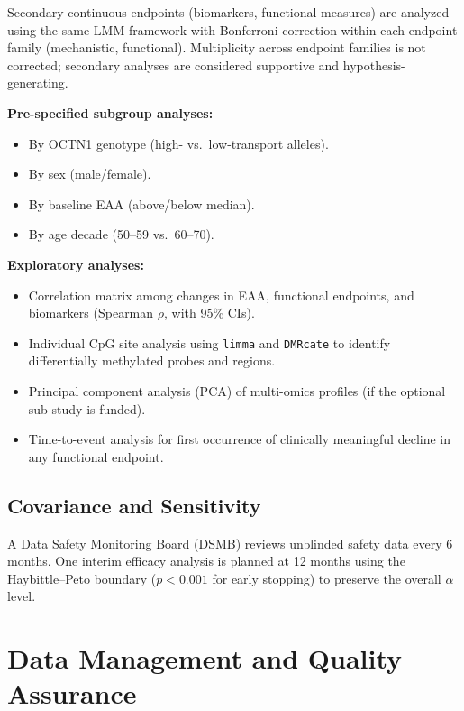 \documentclass[11pt,a4paper]{article}
\begin{document}
Secondary continuous endpoints (biomarkers, functional measures) are analyzed using the same LMM framework with Bonferroni correction within each endpoint family (mechanistic, functional). Multiplicity across endpoint families is not corrected; secondary analyses are considered supportive and hypothesis-generating.

\textbf{Pre-specified subgroup analyses:}
\begin{itemize}[nosep]
  \item By OCTN1 genotype (high- vs.~low-transport alleles).
  \item By sex (male/female).
  \item By baseline EAA (above/below median).
  \item By age decade (50--59 vs.~60--70).
\end{itemize}

\textbf{Exploratory analyses:}
\begin{itemize}[nosep]
  \item Correlation matrix among changes in EAA, functional endpoints, and biomarkers (Spearman $\rho$, with 95\% CIs).
  \item Individual CpG site analysis using \texttt{limma} and \texttt{DMRcate} to identify differentially methylated probes and regions.
  \item Principal component analysis (PCA) of multi-omics profiles (if the optional sub-study is funded).
  \item Time-to-event analysis for first occurrence of clinically meaningful decline in any functional endpoint.
\end{itemize}

\subsection{Covariance and Sensitivity}

A Data Safety Monitoring Board (DSMB) reviews unblinded safety data every 6 months. One interim efficacy analysis is planned at 12 months using the Haybittle--Peto boundary ($p < 0.001$ for early stopping) to preserve the overall $\alpha$ level.

\section{Data Management and Quality Assurance}
\end{document}
